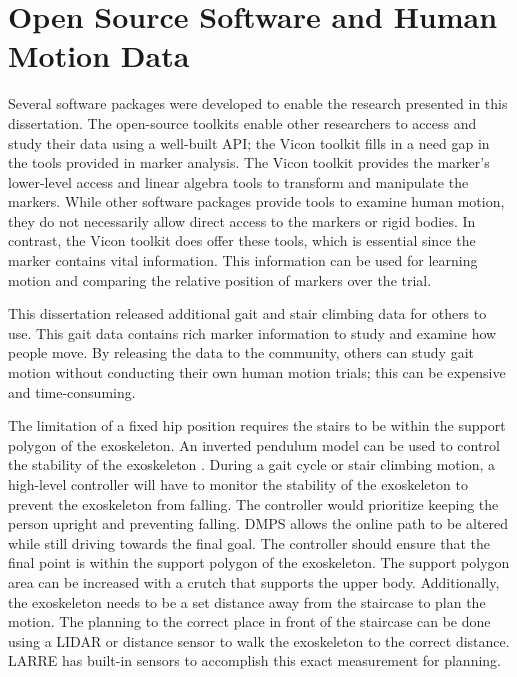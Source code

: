 \section{Open Source Software and Human Motion Data}

Several software packages were developed to enable the research presented in this dissertation. The open-source toolkits enable other researchers to access and study their data using a well-built API; the Vicon toolkit fills in a need gap in the tools provided in marker analysis. The Vicon toolkit provides the marker's lower-level access and linear algebra tools to transform and manipulate the markers. While other software packages provide tools to examine human motion, they do not necessarily allow direct access to the markers or rigid bodies. In contrast, the Vicon toolkit does offer these tools, which is essential since the marker contains vital information. This information can be used for learning motion and comparing the relative position of markers over the trial. 

This dissertation released additional gait and stair climbing data for others to use. This gait data contains rich marker information to study and examine how people move. By releasing the data to the community, others can study gait motion without conducting their own human motion trials; this can be expensive and time-consuming. 

The limitation of a fixed hip position requires the stairs to be within the support polygon of the exoskeleton. An inverted pendulum model can be used to control the stability of the exoskeleton \cite{chen2018dynamic}. During a gait cycle or stair climbing motion, a high-level controller will have to monitor the stability of the exoskeleton to prevent the exoskeleton from falling. The controller would prioritize keeping the person upright and preventing falling.   DMPS allows the online path to be altered while still driving towards the final goal. The controller should ensure that the final point is within the support polygon of the exoskeleton. The support polygon area can be increased with a crutch that supports the upper body. Additionally, the exoskeleton needs to be a set distance away from the staircase to plan the motion. The planning to the correct place in front of the staircase can be done using a LIDAR or distance sensor to walk the exoskeleton to the correct distance. LARRE has built-in sensors to accomplish this exact measurement for planning. 


